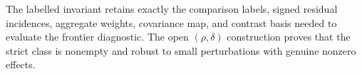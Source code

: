 The labelled invariant retains exactly the comparison labels, signed residual incidences, aggregate weights, covariance map, and contrast basis needed to evaluate the frontier diagnostic. The open \((\rho,\delta)\) construction proves that the strict class is nonempty and robust to small perturbations with genuine nonzero effects.